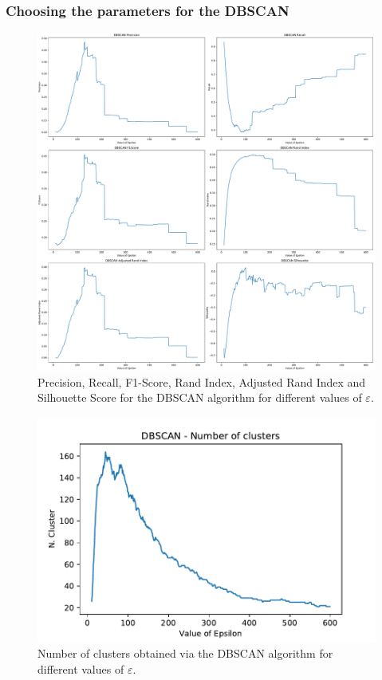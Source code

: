 \documentclass[a4paper]{article}
\begin{document}
	\subsubsection{Choosing the parameters for the DBSCAN}
	 	\begin{figure}
		\includegraphics[width=\linewidth]{dbscan_indeces.pdf}
		\caption{Precision, Recall, F1-Score, Rand Index, Adjusted Rand Index and Silhouette Score for the DBSCAN algorithm for different values of $\varepsilon$.}
		\label{fig:dbscan}
	\end{figure}
	\begin{figure}
		\includegraphics[width=\linewidth]{dbscan_num_cluster.pdf}
		\caption{Number of clusters obtained via the DBSCAN algorithm for different values of $\varepsilon$.}
		\label{fig:dbscan_clusters}
	\end{figure}
\end{document}

